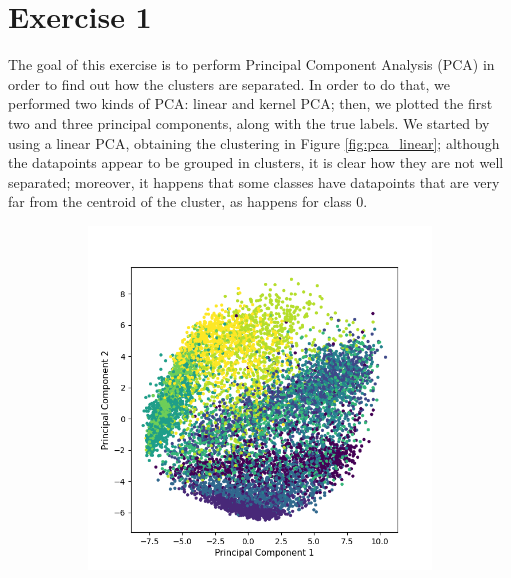 \documentclass[12pt]{article}
\begin{document}
\section{Exercise 1}
The goal of this exercise is to perform Principal Component Analysis (PCA) in order to find out how the clusters are separated. In order to do that, we performed two kinds of PCA: linear and kernel PCA; then, we plotted the first two and three principal components, along with the true labels.\newline
We started by using a linear PCA, obtaining the clustering in Figure \ref{fig:pca_linear}; although the datapoints appear to be grouped in clusters, it is clear how they are not well separated; moreover, it happens that some classes have datapoints that are very far from the centroid of the cluster, as happens for class 0.
\begin{figure}[h]
	\begin{subfigure}{0.5\textwidth}
		\includegraphics[width=0.4\textheight]{pca_linear_2comps.png}
		\caption{}
		\label{subfig:pca_linear_2comps}
	\end{subfigure}
	\begin{subfigure}{0.5\textwidth}

\end{subfigure}
\end{figure}
\end{document}
